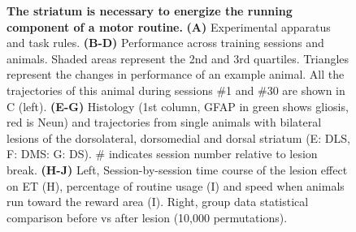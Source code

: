 \begin{figure}[bth!]
 \begin{center}
	\caption[The Striatum Energizes Motor Routines]
	{\textbf{The striatum is necessary to energize the running component of a motor routine.}
	\textbf{(A)} Experimental apparatus and task rules.
	\textbf{(B-D)} Performance across training sessions and animals.
	Shaded areas represent the 2nd and 3rd quartiles. Triangles represent the changes in performance of an example animal. 
	All the trajectories of this animal during sessions \#1 and \#30 are shown in C (left). 
	\textbf{(E-G)} Histology (1st column, GFAP in green shows gliosis, red is Neun) and trajectories from single animals with bilateral lesions of the dorsolateral, dorsomedial and dorsal striatum (E: DLS, F: DMS: G: DS).
	\# indicates session number relative to lesion break.
	\textbf{(H-J)} Left, Session-by-session time course of the lesion effect on ET (H), percentage of routine usage (I) and speed when animals run toward the reward area (I).
	Right, group data statistical comparison before vs after lesion (10,000 permutations).
	}
	\label{fig:lesion:task}
 \end{center}
\end{figure}